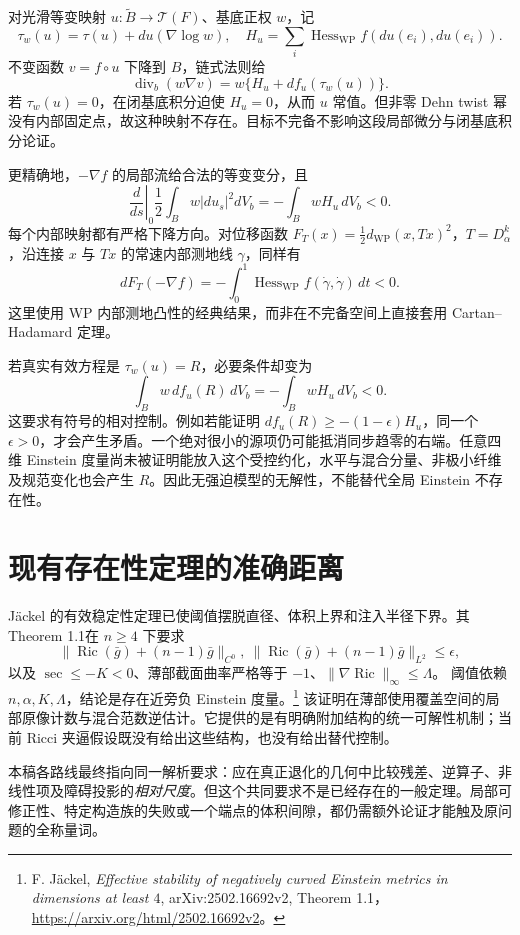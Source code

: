 \documentclass[UTF8,fontset=fandol,zihao=-4,oneside,openany]{ctexbook}
\theoremstyle{cjkplain}
\numberwithin{equation}{chapter}
\DeclareMathOperator{\Ric}{Ric}
\begin{document}
对光滑等变映射 $u:\widetilde B\to\mathcal T(F)$、基底正权 $w$，记
\[
\tau_w(u)=\tau(u)+du(\nabla\log w),\quad
H_u=\sum_i\operatorname{Hess}_{\mathrm{WP}}f(du(e_i),du(e_i)).
\]
不变函数 $v=f\circ u$ 下降到 $B$，链式法则给
\begin{equation}\label{GLB:WPsource}
\operatorname{div}_b(w\nabla v)
=w\{H_u+df_u(\tau_w(u))\}.
\end{equation}
若 $\tau_w(u)=0$，在闭基底积分迫使 $H_u=0$，从而 $u$ 常值。但非零 Dehn twist 幂没有内部固定点，故这种映射不存在。目标不完备不影响这段局部微分与闭基底积分论证。

更精确地，$-\nabla f$ 的局部流给合法的等变变分，且
\[
\left.\frac d{ds}\right|_0\frac12\int_Bw|du_s|^2dV_b
=-\int_BwH_u\,dV_b<0.
\]
每个内部映射都有严格下降方向。对位移函数
$F_T(x)=\frac12d_{\mathrm{WP}}(x,Tx)^2$，$T=D_\alpha^k$，沿连接 $x$ 与 $Tx$ 的常速内部测地线 $\gamma$，同样有
\[
dF_T(-\nabla f)=-\int_0^1\operatorname{Hess}_{\mathrm{WP}}f(\dot\gamma,\dot\gamma)\,dt<0.
\]
这里使用 WP 内部测地凸性的经典结果，而非在不完备空间上直接套用 Cartan--Hadamard 定理。

若真实有效方程是 $\tau_w(u)=R$，必要条件却变为
\begin{equation}\label{GLB:WPbalance}
\int_B w\,df_u(R)\,dV_b=-\int_BwH_u\,dV_b<0.
\end{equation}
这要求有符号的相对控制。例如若能证明
$df_u(R)\ge-(1-\epsilon)H_u$，同一个 $\epsilon>0$，才会产生矛盾。一个绝对很小的源项仍可能抵消同步趋零的右端。任意四维 Einstein 度量尚未被证明能放入这个受控约化，水平与混合分量、非极小纤维及规范变化也会产生 $R$。因此无强迫模型的无解性，不能替代全局 Einstein 不存在性。

\clearpage
\section{现有存在性定理的准确距离}
Jäckel 的有效稳定性定理已使阈值摆脱直径、体积上界和注入半径下界。其Theorem 1.1在 $n\ge4$ 下要求
\[
\|\Ric(\bar g)+(n-1)\bar g\|_{C^0},\ 
\|\Ric(\bar g)+(n-1)\bar g\|_{L^2}\le\epsilon,
\]
以及 $\sec\le-K<0$、薄部截面曲率严格等于 $-1$、$\|\nabla\Ric\|_\infty\le\Lambda$。
阈值依赖 $n,\alpha,K,\Lambda$，结论是存在近旁负 Einstein 度量。\footnote{F. Jäckel, \emph{Effective stability of negatively curved Einstein metrics in dimensions at least $4$}, arXiv:2502.16692v2, Theorem 1.1，\url{https://arxiv.org/html/2502.16692v2}。}
该证明在薄部使用覆盖空间的局部原像计数与混合范数逆估计。它提供的是有明确附加结构的统一可解性机制；当前 Ricci 夹逼假设既没有给出这些结构，也没有给出替代控制。

本稿各路线最终指向同一解析要求：应在真正退化的几何中比较残差、逆算子、非线性项及障碍投影的\emph{相对尺度}。但这个共同要求不是已经存在的一般定理。局部可修正性、特定构造族的失败或一个端点的体积间隙，都仍需额外论证才能触及原问题的全称量词。
\end{document}
